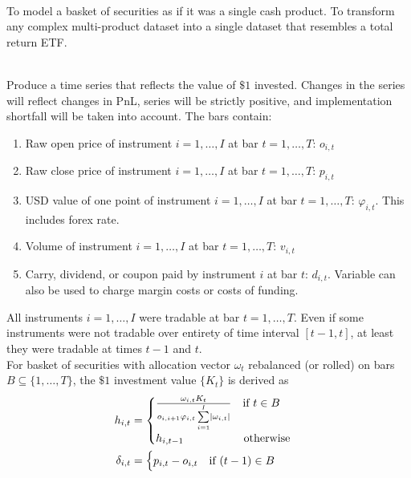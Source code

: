 \begin{definition} \\
To model a basket of securities as if it was a single cash product. To transform any complex multi-product dataset into a single dataset that resembles a total return ETF.
\end{definition}

\begin{method} \\
Produce a time series that reflects the value of $\$1$ invested. Changes in the series will reflect changes in PnL, series will be strictly positive, and implementation shortfall will be taken into account. The bars contain:
\begin{enumerate}[label=\roman*.]
\setlength{\itemsep}{0pt}
\item Raw open price of instrument $i = 1, \ldots, I$ at bar $t = 1, \ldots, T$: $o_{i,t}$
\item Raw close price of instrument $i = 1, \ldots, I$ at bar $t = 1, \ldots, T$: $p_{i,t}$
\item USD value of one point of instrument $i = 1, \ldots, I$ at bar $t = 1, \ldots, T$: $\varphi_{i,t}$. This includes forex rate.
\item Volume of instrument $i = 1, \ldots, I$ at bar $t = 1, \ldots, T$: $v_{i,t}$
\item Carry, dividend, or coupon paid by instrument $i$ at bar $t$: $d_{i,t}$. Variable can also be used to charge margin costs or costs of funding.
\end{enumerate}
All instruments $i = 1, \ldots, I$ were tradable at bar $t = 1, \ldots, T$. Even if some instruments were not tradable over entirety of time interval $[t-1, t]$, at least they were tradable at times $t-1$ and $t$.\\
For basket of securities with allocation vector $\omega_t$ rebalanced (or rolled) on bars $B \subseteq \{1, \ldots, T \}$, the $\$1$ investment value $\{K_t\}$ is derived as 
\begin{align}
h_{i,t} &= 
\begin{cases}
\frac{\omega_{i,t} K_t}{o_{i, i+1} \varphi_{i,t} \sum\limits_{i=1}^I \left\lvert\omega_{i,t}\right\rvert} \ \ \ \text{if } t \in B \\
h_{i, t - 1} \ \ \ \ \ \ \ \ \ \ \ \ \ \ \ \ \text{otherwise}
\end{cases} \nonumber \\
\delta_{i,t} &=
\begin{cases}
p_{i,t} - o_{i,t} \ \ \ \text{if } (t-1) \in B \\

\end{cases}
\end{align}
\end{method}
